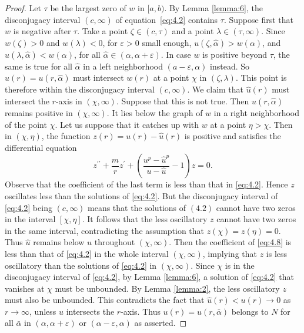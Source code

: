 \begin{proof}
  Let $\tau$ be the largest zero of $w$ in $[a, b)$.
  By Lemma \ref{lemma:6}, the disconjugacy interval $(c, \infty)$ of equation~\eqref{eq:4.2} contains $\tau$. 
  Suppose first that $w$ is negative after $\tau$. Take a point $\zeta \in(c, \tau)$ and a 
  point $\lambda \in(\tau, \infty)$. Since $w(\zeta)>0$ and $w(\lambda)<0$, for $\varepsilon>0$ 
  small enough, $u(\zeta, \hat{\alpha})>w(\alpha)$, and $u(\lambda, \hat{\alpha})<w(\alpha)$, 
  for all $\hat{\alpha} \in(\alpha, \alpha+\varepsilon)$. In case $w$ is positive beyond 
  $\tau$, the same is true for all $\hat{\alpha}$ in a left neighborhood
  $(a-\varepsilon, \alpha)$ instead. So $\hat{u}(r)=u(r, \hat{\alpha})$ must intersect $w(r)$ 
  at a point $\chi$ in $(\zeta, \lambda)$. This point is therefore within the disconjugacy 
  interval $(c, \infty)$. We claim that $\hat{u}(r)$ must intersect the $r$-axis
  in $(\chi, \infty)$. Suppose that this is not true. Then $u(r, \hat{\alpha})$
  remains positive in $(\chi, \infty)$. It lies below the graph of $w$ in a right neighborhood 
  of the point $\chi$. Let us suppose that it catches up with $w$ at a point $\eta>\chi$.
  Then in $(\chi, \eta)$, the function $z(r)=u(r)-\hat{u}(r)$ is positive and satisfies the 
  differential equation
  \begin{equation}\label{eq:4.8}
    z^{\prime \prime}+\frac{m}{r} z^{\prime}+\left(\frac{u^p-\hat{u}^p}{u-\hat{u}}-1\right) z=0.    
  \end{equation}
  Observe that the coefficient of the last term is less than that in \eqref{eq:4.2}.
  Hence $z$ oscillates less than the solutions of \eqref{eq:4.2}.
  But the disconjugacy interval of \eqref{eq:4.2}
  being $(c, \infty)$ means that the solutions of $(4.2)$ cannot have two zeros in the interval 
  $[\chi, \eta]$. It follows that the less oscillatory $z$ cannot have two zeros in the same 
  interval, contradicting the assumption that $z(\chi)=z(\eta)=0$. Thus $\hat{u}$ remains below 
  $u$ throughout $(\chi, \infty)$.
  Then the coefficient of \eqref{eq:4.8} is less than that of \eqref{eq:4.2}
  in the whole interval $(\chi, \infty)$, implying that $z$ is less oscillatory than the 
  solutions of \eqref{eq:4.2} in $(\chi, \infty)$. Since $\chi$ is in the disconjugacy interval
  of \eqref{eq:4.2}, by Lemma \ref{lemma:6},
  a solution of \eqref{eq:4.2} that vanishes at $\chi$ must be unbounded.
  By Lemma \ref{lemma:2}, the less oscillatory $z$ must also be unbounded.
  This contradicts the fact that 
  $\hat{u}(r)<u(r) \rightarrow 0$ as $r \rightarrow \infty$, unless $\hat{u}$ intersects the 
  $r$-axis. Thus $u(r)=u(r, \bar{\alpha})$ belongs to $N$ for all $\bar{\alpha}$
  in $(\alpha, \alpha+\varepsilon)$ or $(\alpha-\varepsilon, \alpha)$ as asserted.
\end{proof}

